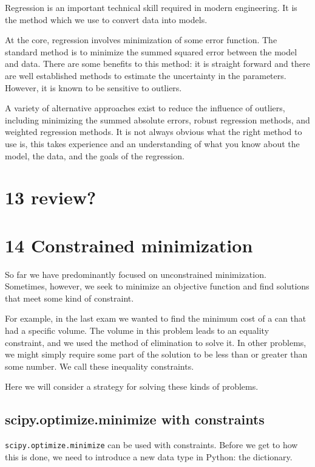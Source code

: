 \documentclass[11pt]{article}
\begin{document}
Regression is an important technical skill required in modern engineering. It is the method which we use to convert data into models.

At the core, regression involves minimization of some error function. The standard method is to minimize the summed squared error between the model and data. There are some benefits to this method: it is straight forward and there are well established methods to estimate the uncertainty in the parameters. However, it is known to be sensitive to outliers.

A variety of alternative approaches exist to reduce the influence of outliers, including minimizing the summed absolute errors, robust regression methods, and weighted regression methods. It is not always obvious what the right method to use is, this takes experience and an understanding of what you know about the model, the data, and the goals of the regression.

\section{13 review?}
\label{sec:org4ce755d}

\section{14 Constrained minimization}
\label{sec:org81fef08}

So far we have predominantly focused on unconstrained minimization. Sometimes, however, we seek to minimize an objective function and find solutions that meet some kind of constraint.

For example, in the last exam we wanted to find the minimum cost of a can that had a specific volume. The volume in this problem leads to an equality constraint, and we used the method of elimination to solve it. In other problems, we might simply require some part of the solution to be less than or greater than some number. We call these inequality constraints.

Here we will consider a strategy for solving these kinds of problems.

\subsection{scipy.optimize.minimize with constraints}
\label{sec:org8c1ef2d}

\texttt{scipy.optimize.minimize} can be used with constraints. Before we get to how this is done, we need to introduce a new data type in Python: the dictionary.
\end{document}
